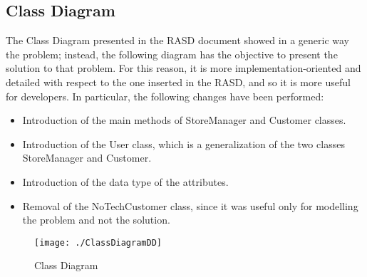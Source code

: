 \subsection{Class Diagram}
The Class Diagram presented in the RASD document showed in a generic way the problem; instead, the following diagram has the objective to present the solution to that problem. For this reason, it is more implementation-oriented and detailed with respect to the one inserted in the RASD, and so it is more useful for developers. In particular, the following changes have been performed:
\begin{itemize}
	\item Introduction of the main methods of StoreManager and Customer classes.
	\item Introduction of the User class, which is a generalization of the two classes StoreManager and Customer.
	\item Introduction of the data type of the attributes.
	\item Removal of the NoTechCustomer class, since it was useful only for modelling the problem and not the solution.
\end{itemize}
\begin{figure}[H]
\centerline{\texttt{[image: ./ClassDiagramDD]}}
\caption{Class Diagram}
\end{figure}